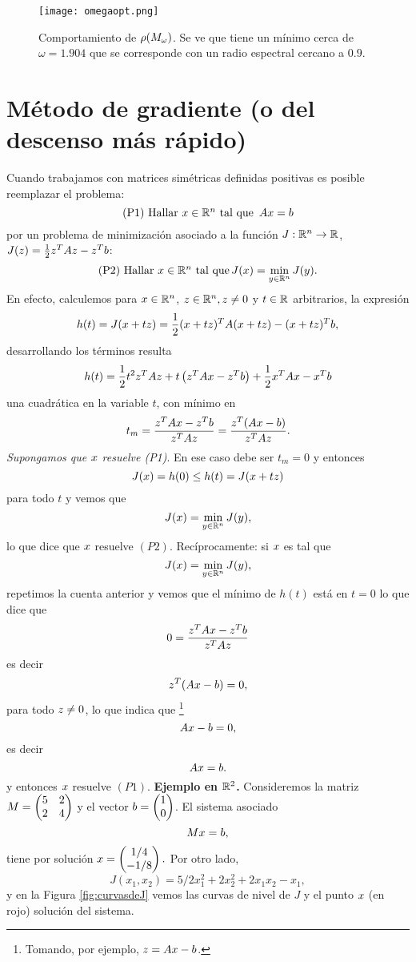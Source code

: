 \begin{figure}[h]
\label{fig:omegasSor}
\centering\texttt{[image: omegaopt.png]}
\caption{Comportamiento de $\rho(\Mb_\omega)$. Se ve que tiene un mínimo cerca de $\omega=1.904$ que se corresponde con un radio espectral cercano a $0.9$. }
\end{figure}

\section{Método de gradiente (o del descenso más rápido)}
Cuando trabajamos con matrices simétricas definidas positivas es posible reemplazar el problema:
$$
\mbox{(P1) Hallar $\xb\in \R^n$ tal que
}\,\Ab\xb=\bb
$$
por un problema de minimización  asociado a la función  $J:\mathbb R^{n}\to \mathbb R$, $J(\zb)=\frac{1}{2}\zb^T\Ab\zb-\zb^T\bb$:
$$
\mbox{(P2) Hallar $\xb\in \Rn$ tal que}\, J(\xb)=
\min_{\yb\in \R^n}J(\yb).
$$
En efecto, calculemos para $\xb\in \Rn$, $\zb\in \Rn, \zb\ne\cero$ y $t\in \mathbb R$ arbitrarios, la expresión
$$
h(t)=J(\xb+t\zb)= \frac{1}{2}(\xb+t\zb)^T\Ab(\xb+t\zb)-(\xb+t\zb)^T\bb,
$$
desarrollando los términos resulta
\begin{equation}
\label{eq:derideh}
h(t)=\frac{1}{2}t^2\zb^T\Ab\zb+t\left(\zb^T\Ab\xb-\zb^T\bb\right) +\frac{1}{2}\xb^T\Ab\xb-\xb^T\bb
\end{equation}
una cuadr\'atica en la variable $t$, con mínimo en
\begin{equation}
\label{eq:minsearch}
t_m=\frac{\zb^T\Ab\xb-\zb^T\bb}{\zb^T\Ab\zb}=\frac{\zb^T(\Ab\xb-\bb)}{\zb^T\Ab\zb}.
\end{equation}
\emph{Supongamos que $\xb$ resuelve (P1)}. En ese caso debe ser $t_m=0$ y entonces
$$
J(\xb)=h(0)\le h(t)=J(\xb+t\zb)
$$
para todo $t$ y vemos que
$$
J(\xb)=\min_{\yb\in\Rn}J(\yb),
$$
lo que dice que $\xb$ resuelve $(P2)$.
Recíprocamente: si $\xb$ es tal que
$$
J(\xb)=\min_{\yb\in\Rn}J(\yb),
$$
repetimos la cuenta anterior y vemos que el mínimo de $h(t)$ está en $t=0$ lo que dice que
$$0=\frac{\zb^T\Ab\xb-\zb^T\bb}{\zb^T\Ab\zb}
$$
es decir
$$
\zb^T(\Ab\xb-\bb)=0,
$$
para todo $\zb\neq \cero$, lo que indica que \footnote{Tomando, por ejemplo, $\zb=\Ab\xb-\bb$.}
$$
\Ab\xb-\bb=\cero,
$$
es decir
$$
\Ab\xb=\bb.
 $$
 y entonces $\xb$ resuelve $(P1)$.
\tcc
\textbf{Ejemplo en $\mathbb R^2$.} Consideremos la matriz $
\Mb=\begin{pmatrix}
     5&2\\
     2&4
    \end{pmatrix}
$ y el vector  $
\bb=\begin{pmatrix}
     1\\
     0
    \end{pmatrix}
$. El sistema asociado
$$
\Mb\xb=\bb,
$$
tiene por solución $\xb=\begin{pmatrix}
    1/4\\
    -1/8
     \end{pmatrix}.
$
Por otro lado,
$$
J(x_1,x_2)=5/2x_1^2+2x_2^2+2x_1x_2-x_1,
$$
y en la Figura \ref{fig:curvasdeJ} vemos las curvas de nivel de $J$ y el punto $\xb$ (en rojo) solución del sistema.
\etcc


